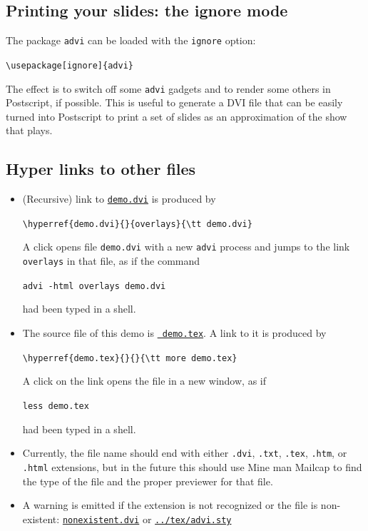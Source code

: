 \documentclass[12pt]{article}
\begin{document}
\subsection* {Printing your slides: the ignore mode}

The package \verb"advi" can be loaded with the \verb"ignore" option:

\smallskip
{\verb"\usepackage[ignore]{advi}"}
\smallskip

\noindent
The effect is to switch off some \verb"advi" gadgets and to render some others 
in Postscript, if possible. This is useful to generate a DVI file that
can be easily turned into Postscript to print a set of slides as an
approximation of the show that {\ActiveDVI} plays.

\newpage

\subsection* {Hyper links to other files}

\begin {itemize}

\item (Recursive) link to \hyperref{demo.dvi}{}{overlays}{\tt demo.dvi}
is produced by

\qquad\verb"\hyperref{demo.dvi}{}{overlays}{\tt demo.dvi}"

A click opens file \verb"demo.dvi" with a new \verb"advi" process and
jumps to the link \verb"overlays" in that file, as if the command

\qquad\verb"advi -html overlays demo.dvi"

had been typed in a shell.

\item The source file of this demo is \hyperref{demo.tex}{}{}{\tt
demo.tex}. A link to it is produced by

\qquad\verb"\hyperref{demo.tex}{}{}{\tt more demo.tex}"

A click on the link opens the file in a new window, as if 

\qquad\verb"less demo.tex"

had been typed in a shell.

\item Currently, the file name should end with either \verb".dvi",
\verb".txt", \verb".tex", \verb".htm", or \verb".html" extensions, but
in the future this should use Mine man Mailcap to find the type of the
file and the proper previewer for that file.

\item A warning is emitted if the extension is not recognized or the file
is non-existent:
\hyperref{nonexistent.dvi}{}{}{\tt nonexistent.dvi}
or
\hyperref{../tex/advi.sty}{}{}{\tt ../tex/advi.sty}

\end {itemize}
\end{document}
